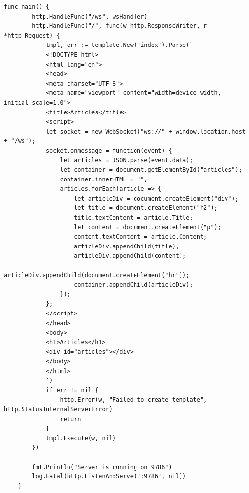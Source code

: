\documentclass[a4paper, 14pt]{extarticle}
\begin{document}
\begin{lstlisting}[language={},caption={client.go},label={lst:code1}]
	func main() {
		http.HandleFunc("/ws", wsHandler)
		http.HandleFunc("/", func(w http.ResponseWriter, r *http.Request) {
			tmpl, err := template.New("index").Parse(`
			<!DOCTYPE html>
			<html lang="en">
			<head>
			<meta charset="UTF-8">
			<meta name="viewport" content="width=device-width, initial-scale=1.0">
			<title>Articles</title>
			<script>
			let socket = new WebSocket("ws://" + window.location.host + "/ws");
			socket.onmessage = function(event) {
				let articles = JSON.parse(event.data);
				let container = document.getElementById("articles");
				container.innerHTML = "";
				articles.forEach(article => {
					let articleDiv = document.createElement("div");
					let title = document.createElement("h2");
					title.textContent = article.Title;
					let content = document.createElement("p");
					content.textContent = article.Content;
					articleDiv.appendChild(title);
					articleDiv.appendChild(content);
					articleDiv.appendChild(document.createElement("hr"));
					container.appendChild(articleDiv);
				});
			};
			</script>
			</head>
			<body>
			<h1>Articles</h1>
			<div id="articles"></div>
			</body>
			</html>
			`)
			if err != nil {
				http.Error(w, "Failed to create template", http.StatusInternalServerError)
				return
			}
			tmpl.Execute(w, nil)
		})
		
		fmt.Println("Server is running on 9786")
		log.Fatal(http.ListenAndServe(":9786", nil))
	}
	\end{lstlisting}
\end{document}
